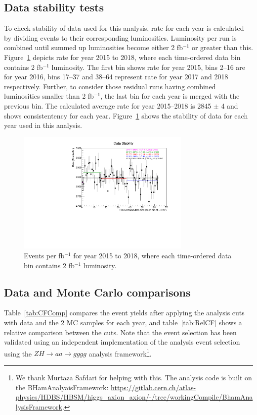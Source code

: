 \subsection{Data stability tests}
To check stability of data used for this analysis, rate for each year is calculated by dividing events to their corresponding luminosities. Luminosity per run is combined until summed up luminosities become either 2 fb$^{-1}$ or greater than this. Figure~\ref{fig:DataStability} depicts rate for year 2015 to 2018, where each time-ordered data bin contains 2 fb$^{-1}$ luminosity. The first bin shows rate for year 2015, bins 2--16 are for year 2016, bins 17--37 and 38--64 represent rate for year 2017 and 2018 respectively. Further, to consider those residual runs having combined luminosities smaller than 2 fb$^{-1}$, the last bin for each year is merged with the previous bin. The calculated average rate for year 2015--2018 is 2845 $\pm$ 4 and shows consistentency for each year. Figure~\ref{fig:DataStability} shows the stability of data for each year used in this analysis.
\begin{figure}[h!]
\centering
\includegraphics[width=0.75\textwidth]{figures/DataStability.pdf}
\caption{Events per fb$^{-1}$ for year 2015 to 2018, where each time-ordered data bin contains 2 fb$^{-1}$ luminosity.}
\label{fig:DataStability}
\end{figure}

\subsection{Data and Monte Carlo comparisons}
\label{sec:datamc}

Table~\ref{tab:CFComp} compares the event yields after applying the analysis cuts with data and the 2 MC samples for each year, and table~\ref{tab:RelCF} shows a relative comparison between the cuts.  Note that the event selection has been validated using an independent implementation of the analysis event selection using the $ZH\rightarrow aa\rightarrow gggg$ analysis framework\footnote{We thank Murtaza Safdari for helping with this.  The analysis code is built on the BHamAnalyaisFramework: \url{https://gitlab.cern.ch/atlas-physics/HDBS/HBSM/higgs_axion_axion/-/tree/workingCompile/BhamAnalysisFramework}.}.

